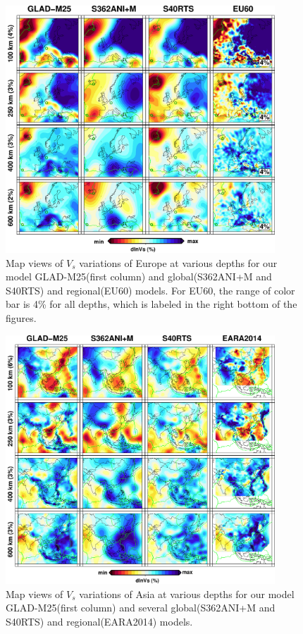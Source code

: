 \documentclass[extra,mreferee]{gji}
\begin{document}
\begin{figure}
\includegraphics[width=0.9\textwidth]{figures/depth_slice/europe_vs.pdf}
  \caption{Map views of $V_s$ variations of Europe at various depths for our model GLAD-M25(first column) and global(S362ANI+M and S40RTS) and regional(EU60\citep{zhu2015seismic}) models. For EU60, the range of color bar is 4\% for all depths, which is labeled in the right bottom of the figures.}
\label{fig:global-vp}
\centering
\end{figure}


\begin{figure}
\includegraphics[width=0.9\textwidth]{figures/depth_slice/asia_vs.pdf}
  \caption{Map views of $V_s$ variations of Asia at various depths for our model GLAD-M25(first column) and several global(S362ANI+M and S40RTS) and regional(EARA2014\citep{chen2015multiparameter}) models.}
\label{fig:global-vp}
\centering
\end{figure}
\end{document}
